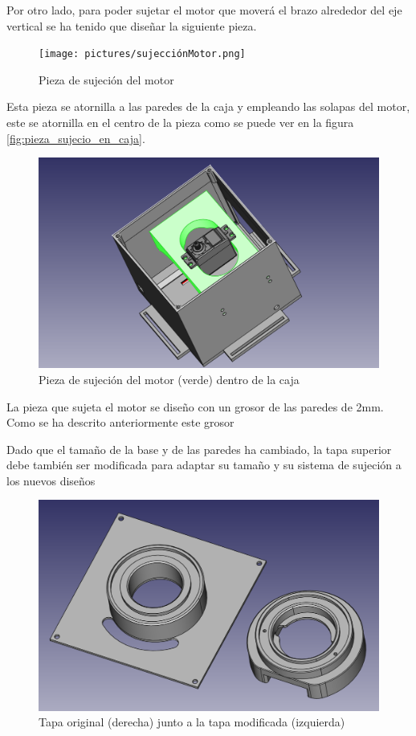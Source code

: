 Por otro lado, para poder sujetar el motor que moverá el brazo alrededor del eje vertical se ha tenido que diseñar la siguiente pieza.

 \begin{figure}[H]
    \centering
    \texttt{[image: pictures/sujecciónMotor.png]}
    \caption{Pieza de sujeción del motor}
    \label{fig:sujecion_motor}
\end{figure}

Esta pieza se atornilla a las paredes de la caja y empleando las solapas del motor, este se atornilla en el centro de la pieza como se puede ver en la figura \ref{fig:pieza_sujecio_en_caja}.

 \begin{figure}[H]
    \centering
    \includegraphics[width=.9\linewidth]{pictures/cajaConMotor.png}
    \caption{Pieza de sujeción del motor (verde) dentro de la caja}
    \label{fig:pieza_sujecio_en_caja_resaltada}
\end{figure}

La pieza que sujeta el motor se diseño con un grosor de las paredes de 2mm. Como se ha descrito anteriormente este grosor 

Dado que el tamaño de la base y de las paredes ha cambiado, la tapa superior debe también ser modificada para adaptar su tamaño y su sistema de sujeción a los nuevos diseños

 \begin{figure}[H]
    \centering
    \includegraphics[width=.9\linewidth]{pictures/DosTapas.png}
    \caption{Tapa original (derecha) junto a la tapa modificada (izquierda)}
    \label{fig:tapas_caja}
\end{figure}

